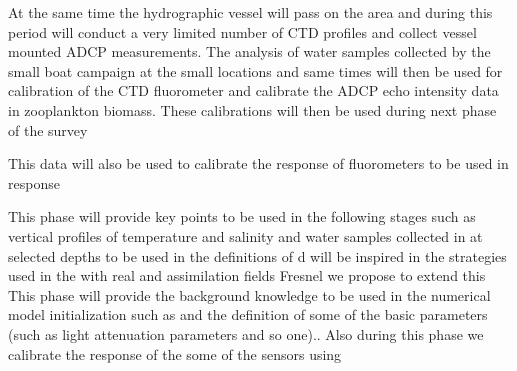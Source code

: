 At the same time the hydrographic vessel will pass on the area and during this period will conduct a very limited number of CTD profiles and collect vessel mounted ADCP measurements. The analysis of water samples collected by the small boat campaign at the small locations and same times will then be used for calibration of the CTD fluorometer and calibrate the ADCP echo intensity data in zooplankton biomass. These calibrations will then be used during next phase of the survey
 
 
This data will also be used to calibrate the response of fluorometers to be used in  response
 
This phase will provide key points to be used in the following stages such as vertical profiles of temperature and salinity and water samples collected in at selected depths to be used in the definitions of  d will be inspired in the strategies used in the  with real and assimilation fields  Fresnel we propose to extend this
This phase will provide the background knowledge to be used in the numerical model initialization such as and the definition of some of the basic parameters (such as light attenuation parameters and so one).. Also during this phase we calibrate the response of the some of the sensors using
 
 

